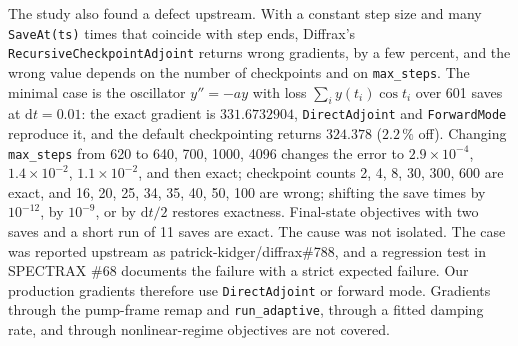 \begin{table}[t]
\caption{C09: reverse-mode derivatives against forward mode, analytic references and the best finite difference.}\label{tab:c09}
\small
{}
\end{table}

The study also found a defect upstream. With a constant step size and many \texttt{SaveAt(ts)} times that coincide with step ends, Diffrax's \texttt{RecursiveCheckpointAdjoint} returns wrong gradients, by a few percent, and the wrong value depends on the number of checkpoints and on \texttt{max\_steps}. The minimal case is the oscillator $y''=-ay$ with loss $\sum_iy(t_i)\cos t_i$ over 601 saves at $\mathrm{d}t=0.01$: the exact gradient is $331.6732904$, \texttt{DirectAdjoint} and \texttt{ForwardMode} reproduce it, and the default checkpointing returns $324.378$ ($2.2\,\%$ off). Changing \texttt{max\_steps} from 620 to 640, 700, 1000, 4096 changes the error to $2.9\times10^{-4}$, $1.4\times10^{-2}$, $1.1\times10^{-2}$, and then exact; checkpoint counts 2, 4, 8, 30, 300, 600 are exact, and 16, 20, 25, 34, 35, 40, 50, 100 are wrong; shifting the save times by $10^{-12}$, by $10^{-9}$, or by $\mathrm{d}t/2$ restores exactness. Final-state objectives with two saves and a short run of 11 saves are exact. The cause was not isolated. The case was reported upstream as patrick-kidger/diffrax\#788, and a regression test in SPECTRAX \#68 documents the failure with a strict expected failure. Our production gradients therefore use \texttt{DirectAdjoint} or forward mode. Gradients through the pump-frame remap and \texttt{run\_adaptive}, through a fitted damping rate, and through nonlinear-regime objectives are not covered.

